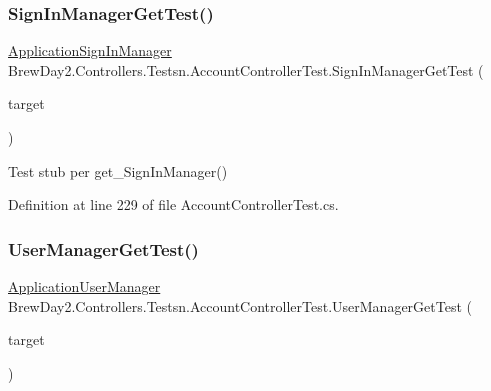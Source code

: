 \subsubsection{\texorpdfstring{Sign\+In\+Manager\+Get\+Test()}{SignInManagerGetTest()}}
{\footnotesize\ttfamily \mbox{\hyperlink{class_brew_day2_1_1_application_sign_in_manager}{Application\+Sign\+In\+Manager}} Brew\+Day2.\+Controllers.\+Testsn.\+Account\+Controller\+Test.\+Sign\+In\+Manager\+Get\+Test (\begin{DoxyParamCaption}\item[{\mbox{[}\+Pex\+Assume\+Under\+Test\mbox{]} \mbox{\hyperlink{class_brew_day2_1_1_controllers_1_1_account_controller}{Account\+Controller}}}]{target }\end{DoxyParamCaption})}



Test stub per get\+\_\+\+Sign\+In\+Manager()



Definition at line 229 of file Account\+Controller\+Test.\+cs.

\mbox{\label{class_brew_day2_1_1_controllers_1_1_testsn_1_1_account_controller_test_a761568223769fd5c42e8091df3ba2fcc}} 
\subsubsection{\texorpdfstring{User\+Manager\+Get\+Test()}{UserManagerGetTest()}}
{\footnotesize\ttfamily \mbox{\hyperlink{class_brew_day2_1_1_application_user_manager}{Application\+User\+Manager}} Brew\+Day2.\+Controllers.\+Testsn.\+Account\+Controller\+Test.\+User\+Manager\+Get\+Test (\begin{DoxyParamCaption}\item[{\mbox{[}\+Pex\+Assume\+Under\+Test\mbox{]} \mbox{\hyperlink{class_brew_day2_1_1_controllers_1_1_account_controller}{Account\+Controller}}}]{target }\end{DoxyParamCaption})}



